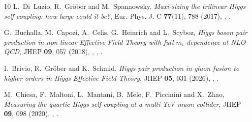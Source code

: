 \documentclass{SciPost}
\begin{document}
\begin{thebibliography}{10}
L.~Di~Luzio, R.~Gr\"ober and M.~Spannowsky,
\newblock \emph{{Maxi-sizing the trilinear Higgs self-coupling: how large could it be?}},
\newblock Eur. Phys. J. C \textbf{77}(11), 788 (2017),
\newblock {},
\newblock {}.

G.~Buchalla, M.~Capozi, A.~Celis, G.~Heinrich and L.~Scyboz,
\newblock \emph{{Higgs boson pair production in non-linear Effective Field Theory with full $m_t$-dependence at NLO QCD}},
\newblock JHEP \textbf{09}, 057 (2018),
\newblock {},
,
\newblock {}.

I.~Brivio, R.~Gr{\"o}ber and K.~Schmid,
\newblock \emph{{Higgs pair production in gluon fusion to higher orders in Higgs Effective Field Theory}},
\newblock JHEP \textbf{05}, 031 (2026),
\newblock {},
\newblock {}.

M.~Chiesa, F.~Maltoni, L.~Mantani, B.~Mele, F.~Piccinini and X.~Zhao,
\newblock \emph{{Measuring the quartic Higgs self-coupling at a multi-TeV muon collider}},
\newblock JHEP \textbf{09}, 098 (2020),
\newblock {},
\newblock {}.

\end{thebibliography}
\end{document}
